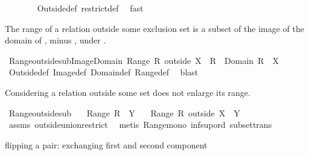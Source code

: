 \begin{isabellebody}
%
\isadelimproof
\ \ \ \ \ \ %
\endisadelimproof
%
\isatagproof
{}\isamarkupfalse%
\ Outside{\isacharunderscore}def\ restrict{\isacharunderscore}def\ \isamarkupfalse%
\ fast%
\endisatagproof
{\isafoldproof}%
%
\isadelimproof
%
\endisadelimproof
%
\begin{isamarkuptext}%
The range of a relation  outside some exclusion set  is a 
  subset of the image of the domain of , minus , under .%
\end{isamarkuptext}%
\isamarkuptrue%
\isamarkupfalse%
\ Range{\isacharunderscore}outside{\isacharunderscore}sub{\isacharunderscore}Image{\isacharunderscore}Domain{\isacharcolon}\ {\isachardoublequoteopen}Range\ {\isacharparenleft}R\ outside\ X{\isacharparenright}\ {\isasymsubseteq}\ R\ {\isacharbackquote}{\isacharbackquote}\ {\isacharparenleft}Domain\ R\ {\isacharminus}\ X{\isacharparenright}{\isachardoublequoteclose}\isanewline
%
\isadelimproof
\ \ \ \ \ \ %
\endisadelimproof
%
\isatagproof
{}\isamarkupfalse%
\ Outside{\isacharunderscore}def\ Image{\isacharunderscore}def\ Domain{\isacharunderscore}def\ Range{\isacharunderscore}def\ \isamarkupfalse%
\ blast%
\endisatagproof
{\isafoldproof}%
%
\isadelimproof
%
\endisadelimproof
%
\begin{isamarkuptext}%
Considering a relation outside some set does not enlarge its range.%
\end{isamarkuptext}%
\isamarkuptrue%
\isamarkupfalse%
\ Range{\isacharunderscore}outside{\isacharunderscore}sub{\isacharcolon}\isanewline
\ \ \ {\isachardoublequoteopen}Range\ R\ {\isasymsubseteq}\ Y{\isachardoublequoteclose}\isanewline
\ \ \ {\isachardoublequoteopen}Range\ {\isacharparenleft}R\ outside\ X{\isacharparenright}\ {\isasymsubseteq}\ Y{\isachardoublequoteclose}\isanewline
%
\isadelimproof
\ \ %
\endisadelimproof
%
\isatagproof
{}\isamarkupfalse%
\ assms\ outside{\isacharunderscore}union{\isacharunderscore}restrict\ \isamarkupfalse%
\ {\isacharparenleft}metis\ Range{\isacharunderscore}mono\ inf{\isacharunderscore}sup{\isacharunderscore}ord{\isacharparenleft}{}{\isacharparenright}\ subset{\isacharunderscore}trans{\isacharparenright}%
\endisatagproof
{\isafoldproof}%
%
\isadelimproof
%
\endisadelimproof
%
\isamarkuptrue%
%
\begin{isamarkuptext}%
flipping a pair: exchanging first and second component%

\end{isamarkuptext}
\end{isabellebody}
